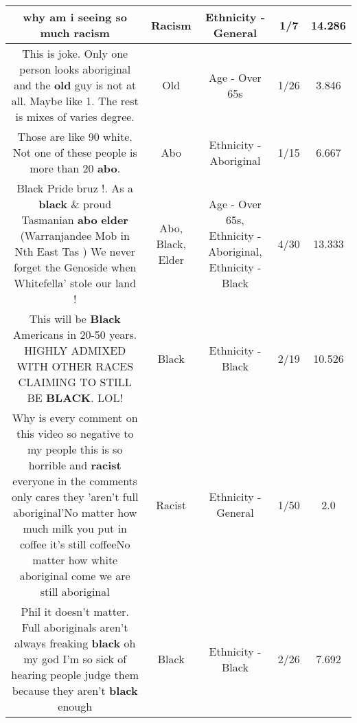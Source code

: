 \documentclass[11pt]{article}
\newlength\mylength
\begin{document}
\begin{center}
\begin{longtable}{|C{.65\mylength}|C{.30\mylength}|C{.12\mylength}|C{.12\mylength}|C{.12\mylength}|}
  \small why am i seeing so much racism\normalsize   & Racism & Ethnicity - General & 1/7 & 14.286 \\  \hline
  \small This is joke. Only one person looks aboriginal and the \textbf{old} guy is not at all. Maybe like 1. The rest is mixes of varies degree.\normalsize   & Old & Age - Over 65s & 1/26 & 3.846 \\  \hline
  \small Those are like 90 white. Not one of these people is more than 20 \textbf{abo}.\normalsize   & Abo & Ethnicity - Aboriginal & 1/15 & 6.667 \\  \hline
  \small Black Pride bruz !. As a \textbf{black} \& proud Tasmanian \textbf{abo} \textbf{elder} (Warranjandee Mob in Nth East Tas ) We never forget the Genoside when Whitefella' stole our land !\normalsize   & Abo, Black, Elder & Age - Over 65s, Ethnicity - Aboriginal, Ethnicity - Black & 4/30 & 13.333 \\  \hline
  \small This will be \textbf{Black} Americans in 20-50 years. HIGHLY ADMIXED WITH OTHER RACES CLAIMING TO STILL BE \textbf{BLACK}. LOL!\normalsize   & Black & Ethnicity - Black & 2/19 & 10.526 \\  \hline
  \small Why is every comment on this video so negative to my people this is so horrible and \textbf{racist} everyone in the comments only cares they 'aren't full aboriginal'No matter how much milk you put in coffee it's still coffeeNo matter how white aboriginal come we are still aboriginal\normalsize   & Racist & Ethnicity - General & 1/50 & 2.0 \\  \hline
  \small Phil it doesn't matter. Full aboriginals aren't always freaking \textbf{black} oh my god I'm so sick of hearing people judge them because they aren't \textbf{black} enough\normalsize   & Black & Ethnicity - Black & 2/26 & 7.692 \\  \hline

\end{longtable}
\end{center}
\end{document}
